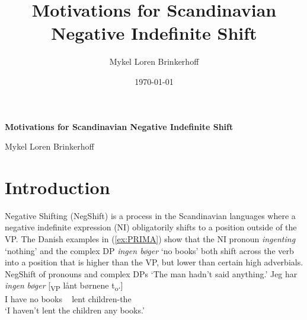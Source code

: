 \documentclass[12pt, letterpaper]{article}
\title{Motivations for Scandinavian Negative Indefinite Shift}
\author{Mykel Loren Brinkerhoff}
\date{\today}
\begin{document}
	
	
	\onehalfspacing
	
\begin{center}
	{\Large \textbf{Motivations for Scandinavian Negative Indefinite Shift}}
	\vspace{6pt}

	Mykel Loren Brinkerhoff
	\vspace{6pt}
\end{center}


\section{Introduction} \label{sec:INTRO}
Negative Shifting (NegShift) is a process in the Scandinavian languages where a negative indefinite expression (NI) obligatorily shifts to a position outside of the VP. The Danish examples in (\ref{ex:PRIMA}) show that the NI pronoun \textit{ingenting} `nothing' and the complex DP \textit{ingen bøger} `no books' both shift across the verb into a position that is higher than the VP, but lower than certain high adverbials. 
	\ea NegShift of pronouns and complex DPs\label{ex:PRIMA}
		 
		\glt `The man hadn't said anything.'
		\ex 
		\gll Jeg har \textit{ingen} \textit{bøger} [\textsubscript{VP} lånt børnene t\textsubscript{o}.]\\
		I have no books ~ lent children-the\\
		\glt `I haven't lent the children any books.'
		\z
	\z 
\end{document}
